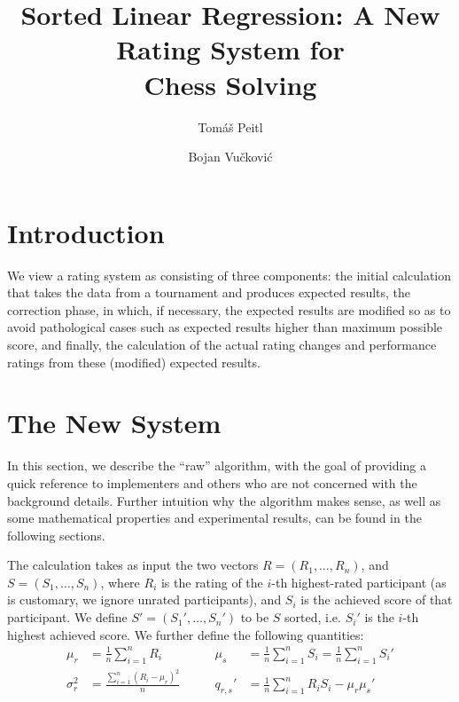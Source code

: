 \documentclass{article}
\title{Sorted Linear Regression: A New Rating System for\\ Chess Solving}
\author{Tom\'{a}\v{s} Peitl \and Bojan Vučković}
\newcommand{\artg}{\mu_r}
\newcommand{\ascr}{\mu_s}
\newcommand{\vrtg}{\sigma_r}
\newcommand{\cov}{q_{r,s}}
\theoremstyle{definition}
\begin{document}
\maketitle
{}

\section{Introduction}
We view a rating system as consisting of three components: the initial calculation that takes the data from a tournament and produces expected results, the correction phase, in which, if necessary, the expected results are modified so as to avoid pathological cases such as expected results higher than maximum possible score, and finally, the calculation of the actual rating changes and performance ratings from these (modified) expected results.

\section{The New System}
In this section, we describe the ``raw'' algorithm, with the goal of providing a quick reference to implementers and others who are not concerned with the background details.
Further intuition why the algorithm makes sense, as well as some mathematical properties and experimental results, can be found in the following sections.

The calculation takes as input the two vectors $R=(R_1,\ldots,R_n)$, and $S=(S_1,\ldots,S_n)$, where $R_i$ is the rating of the $i$-th highest-rated participant (as is customary, we ignore unrated participants), and $S_i$ is the achieved score of that participant.
We define $S'=(S_1',\ldots,S_n')$ to be $S$ sorted, i.e. $S_i'$ is the $i$-th highest achieved score.
We further define the following quantities:
\begin{align*}
\artg&=\frac{1}{n}\sum_{i=1}^n R_i\qquad & \ascr&=\frac{1}{n}\sum_{i=1}^n S_i=\frac{1}{n}\sum_{i=1}^n S_i'\\
\vrtg^2&=\frac{\sum_{i=1}^n (R_i-\artg)^2}{n}\qquad & \cov'&=\frac{1}{n}\sum_{i=1}^n R_iS_i-\artg\ascr'
\end{align*}
\end{document}
